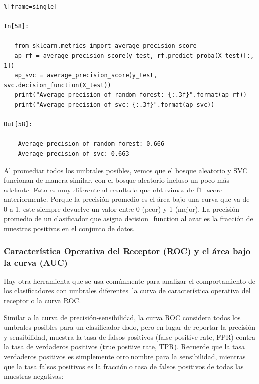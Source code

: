 {\begin{lstlisting}%[frame=single]

In[58]:
   
   from sklearn.metrics import average_precision_score
   ap_rf = average_precision_score(y_test, rf.predict_proba(X_test)[:, 1])
   ap_svc = average_precision_score(y_test, svc.decision_function(X_test))
   print("Average precision of random forest: {:.3f}".format(ap_rf))
   print("Average precision of svc: {:.3f}".format(ap_svc))

Out[58]:
   
    Average precision of random forest: 0.666
    Average precision of svc: 0.663

\end{lstlisting}


Al promediar todos los umbrales posibles, vemos que el bosque aleatorio y SVC
funcionan de manera similar, con el bosque aleatorio incluso un poco más adelante. Esto es muy diferente al  resultado que obtuvimos de {\ttfamily f1\_score} anteriormente.   Porque la precisión promedio es el área bajo una curva que va de 0 a 1, este siempre devuelve un valor  entre 0 (peor) y 1 (mejor). La precisión promedio de un clasificador que  asigna  {\ttfamily decision\_function}  al azar es la fracción de muestras positivas en el conjunto de datos.  


\subsubsection{Característica Operativa del Receptor (ROC) y el área bajo la curva  (AUC)}


Hay otra herramienta que se usa comúnmente para analizar el comportamiento de los clasificadores con
umbrales diferentes: la curva de característica operativa del receptor o la curva ROC. 

Similar a la curva de precisión-sensibilidad, la curva ROC considera todos los umbrales posibles para un clasificador dado, pero en lugar de reportar la precisión y sensibilidad, muestra la tasa de falsos positivos (false positive rate,  FPR) contra la tasa de verdaderos positivos (true positive rate, TPR). Recuerde  que la tasa verdaderos positivos  es simplemente otro nombre para la sensibilidad, mientras que la tasa falsos positivos es la fracción o tasa de falsos positivos de todas las muestras negativas:\\

}
